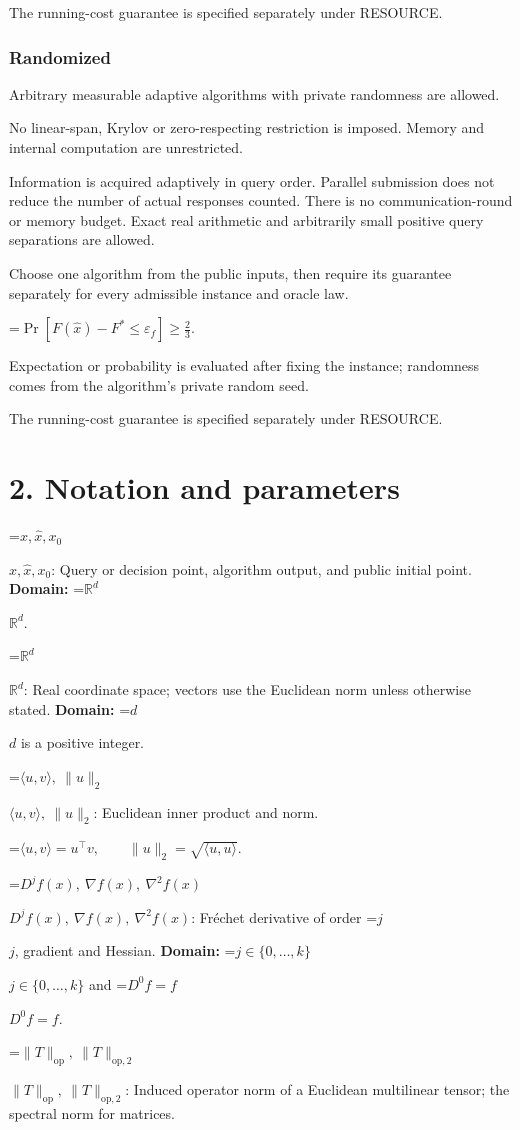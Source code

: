 \documentclass[10pt,a4paper]{article}
\newcommand{\AtlasMath}[1]{\par\begingroup\centering\setbox0=\hbox{$\displaystyle #1$}\ifdim\wd0>1.4\linewidth\typeout{ATLAS WIDE FORMULA: \the\wd0}\fi\ifdim\wd0>\linewidth\resizebox{\linewidth}{!}{\box0}\else\box0\fi\par\endgroup}
\newcommand{\AtlasInlineMath}[1]{\begingroup\setbox0=\hbox{$#1$}\ifdim\wd0>.4\linewidth\endgroup\AtlasMath{#1}\else\endgroup$#1$\fi}
\begin{document}
The running-cost guarantee is specified separately under RESOURCE.

\subsubsection{Randomized}
Arbitrary measurable adaptive algorithms with private randomness are allowed.

No linear-span, Krylov or zero-respecting restriction is imposed. Memory and internal computation are unrestricted.

Information is acquired adaptively in query order. Parallel submission does not reduce the number of actual responses counted. There is no communication-round or memory budget. Exact real arithmetic and arbitrarily small positive query separations are allowed.

Choose one algorithm from the public inputs, then require its guarantee separately for every admissible instance and oracle law.


\AtlasMath{\Pr\!\left[F(\widehat{x})-F^*\le \varepsilon_f\right]\ge\frac23.}


Expectation or probability is evaluated after fixing the instance; randomness comes from the algorithm's private random seed.

The running-cost guarantee is specified separately under RESOURCE.

\section{2. Notation and parameters}
\AtlasInlineMath{x,\widehat{x},x_0}: Query or decision point, algorithm output, and public initial point. \textbf{Domain:} \AtlasInlineMath{\mathbb{R}^d}.

\AtlasInlineMath{\mathbb{R}^d}: Real coordinate space; vectors use the Euclidean norm unless otherwise stated. \textbf{Domain:} \AtlasInlineMath{d} is a positive integer.

\AtlasInlineMath{\langle u,v\rangle,\ \|u\|_2}: Euclidean inner product and norm.


\AtlasMath{\langle u,v\rangle=u^\top v,\qquad\|u\|_2=\sqrt{\langle u,u\rangle}.}


\AtlasInlineMath{D^jf(x),\ \nabla f(x),\ \nabla^2f(x)}: Fréchet derivative of order \AtlasInlineMath{j}, gradient and Hessian. \textbf{Domain:} \AtlasInlineMath{j\in\{0,\ldots,k\}} and \AtlasInlineMath{D^0f=f}.

\AtlasInlineMath{\|T\|_{\mathrm{op}},\ \|T\|_{\mathrm{op},2}}: Induced operator norm of a Euclidean multilinear tensor; the spectral norm for matrices.
\end{document}
